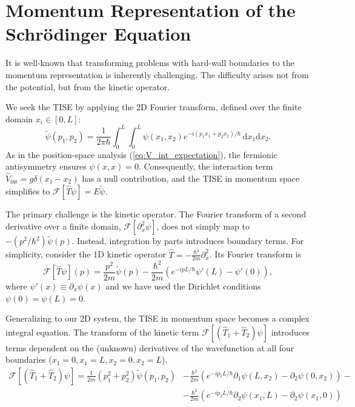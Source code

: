 \section{Momentum Representation of the Schr\"odinger Equation} \label{sec:momentum}

It is well-known that transforming problems with hard-wall boundaries
to the momentum representation is inherently challenging.
The difficulty arises not from the potential, but from the
kinetic operator.

We seek the TISE by applying the 2D Fourier transform,
defined over the finite domain $x_i \in [0, L]$:
\begin{equation} \label{eq:fourier-transform}
	\tilde{\psi}(p_1, p_2) = \frac{1}{2\pi \hbar} \int_0^L \int_0^L \psi(x_1, x_2)
	e^{-i (p_1 x_1 + p_2 x_2)/ \hbar} \, \mathrm{d}x_1 \mathrm{d}x_2.
\end{equation}
As in the position-space analysis (\cref{eq:V_int_expectation}),
the fermionic antisymmetry ensures $\psi(x, x) = 0$. Consequently,
the interaction term $\hat{V}_{\text{int}} = g\delta(x_1 - x_2)$
has a null contribution, and the TISE in momentum space simplifies to
$\mathcal{F}[\hat{T}\psi] = E \tilde{\psi}$.

The primary challenge is the kinetic operator. The Fourier transform
of a second derivative over a finite domain, $\mathcal{F}[\partial_x^2 \psi]$,
does not simply map to $-(p^2/\hbar^2) \tilde{\psi}(p)$.
Instead, integration by parts introduces boundary terms.
For simplicity, consider the 1D kinetic operator $\hat{T} =
-\frac{\hbar^2}{2m}\partial_x^2$. Its Fourier transform is
\begin{equation} \label{eq:ft_kinetic_1d}
	\mathcal{F}[\hat{T}\psi](p) = \frac{p^2}{2m} \tilde{\psi}(p)
	- \frac{\hbar^2}{2m} \left( e^{-i p L/\hbar} \psi'(L) - \psi'(0) \right),
\end{equation}
where $\psi'(x) \equiv \partial_x \psi(x)$ and we have used the
Dirichlet conditions $\psi(0) = \psi(L) = 0$.

Generalizing to our 2D system, the TISE in momentum space
becomes a complex integral equation. The transform of the kinetic term
$\mathcal{F}[(\hat{T}_1 + \hat{T}_2)\psi]$ introduces terms dependent
on the (unknown) derivatives of the wavefunction at all four boundaries
($x_1=0, x_1=L, x_2=0, x_2=L$).
\begin{equation}
	\begin{split}
		\mathcal{F}[(\hat{T}_1 + \hat{T}_2)\psi] = \frac{1}{2m}(p_1^2 + p_2^2)
		\tilde{\psi}(p_1, p_2) &- \frac{\hbar^2}{2m} \left( e^{-i p_1 L / \hbar} \partial_1 \psi(L, x_2) -
		\partial_2 \psi(0, x_2) \right) - \\
													 &- \frac{\hbar^2}{2m} \left(e^{-i p_2 L / \hbar} \partial_2 \psi(x_1, L) - \partial_2 \psi(x_1, 0) \right)
		\end{split}
\end{equation}

